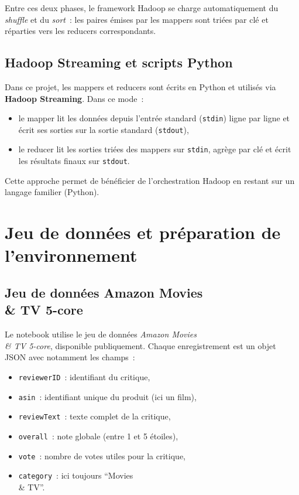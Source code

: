 \documentclass[a4paper,11pt]{article}
\begin{document}
Entre ces deux phases, le framework Hadoop se charge automatiquement
du \emph{shuffle} et du \emph{sort}~: les paires émises par les mappers
sont triées par clé et réparties vers les reducers correspondants.

\subsection{Hadoop Streaming et scripts Python}

Dans ce projet, les mappers et reducers sont écrits en Python et
utilisés via \textbf{Hadoop Streaming}. Dans ce mode~:
\begin{itemize}
  \item le mapper lit les données depuis l'entrée standard (\texttt{stdin})
        ligne par ligne et écrit ses sorties sur la sortie standard
        (\texttt{stdout}),\
  \item le reducer lit les sorties triées des mappers sur \texttt{stdin},
        agrège par clé et écrit les résultats finaux sur \texttt{stdout}.
\end{itemize}

Cette approche permet de bénéficier de l'orchestration Hadoop en restant
sur un langage familier (Python).

\section{Jeu de données et préparation de l'environnement}

\subsection{Jeu de données Amazon Movies \\& TV 5-core}

Le notebook utilise le jeu de données \emph{Amazon Movies \\& TV 5-core},
disponible publiquement. Chaque enregistrement est un objet JSON avec
notamment les champs~:
\begin{itemize}
  \item \texttt{reviewerID}~: identifiant du critique,\
  \item \texttt{asin}~: identifiant unique du produit (ici un film),\
  \item \texttt{reviewText}~: texte complet de la critique,\
  \item \texttt{overall}~: note globale (entre 1 et 5 étoiles),\
  \item \texttt{vote}~: nombre de votes utiles pour la critique,\
  \item \texttt{category}~: ici toujours ``Movies \\& TV''.
\end{itemize}
\end{document}
